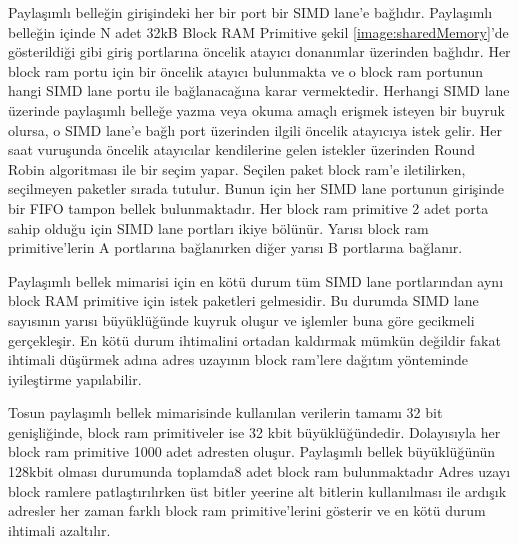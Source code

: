 Paylaşımlı belleğin girişindeki her bir port bir SIMD lane'e bağlıdır. Paylaşımlı belleğin içinde N adet 32kB Block RAM Primitive şekil \ref{image:sharedMemory}'de gösterildiği gibi giriş portlarına öncelik atayıcı donanımlar üzerinden bağlıdır. Her block ram portu için bir öncelik atayıcı bulunmakta ve o block ram portunun hangi SIMD lane portu ile bağlanacağına karar vermektedir. Herhangi SIMD lane üzerinde paylaşımlı belleğe yazma veya okuma amaçlı erişmek isteyen bir buyruk olursa, o SIMD lane'e bağlı port üzerinden ilgili öncelik atayıcıya istek gelir. Her saat vuruşunda öncelik atayıcılar kendilerine gelen istekler üzerinden Round Robin algoritması ile bir seçim yapar. Seçilen paket block ram'e iletilirken, seçilmeyen paketler sırada tutulur. Bunun için her SIMD lane portunun girişinde bir FIFO tampon bellek bulunmaktadır. Her block ram primitive 2 adet porta sahip olduğu için SIMD lane portları ikiye bölünür. Yarısı block ram primitive'lerin A portlarına bağlanırken diğer yarısı B portlarına bağlanır.\par

Paylaşımlı bellek mimarisi için en kötü durum tüm SIMD lane portlarından aynı block RAM primitive için istek paketleri gelmesidir. Bu durumda SIMD lane sayısının yarısı büyüklüğünde kuyruk oluşur ve işlemler buna göre gecikmeli gerçekleşir. En kötü durum ihtimalini ortadan kaldırmak mümkün değildir fakat ihtimali düşürmek adına adres uzayının block ram'lere dağıtım yönteminde iyileştirme yapılabilir. \par

Tosun paylaşımlı bellek mimarisinde kullanılan verilerin tamamı 32 bit genişliğinde, block ram primitiveler ise 32 kbit büyüklüğündedir. Dolayısıyla her block ram primitive 1000 adet adresten oluşur. Paylaşımlı bellek büyüklüğünün 128kbit olması durumunda toplamda8 adet block ram bulunmaktadır Adres uzayı block ramlere patlaştırılırken üst bitler yeerine alt bitlerin kullanılması ile ardışık adresler her zaman farklı block ram primitive'lerini gösterir ve en kötü durum ihtimali azaltılır. 
